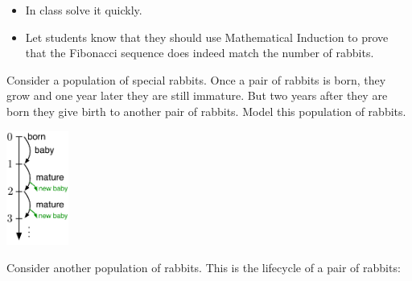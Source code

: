 \begin{annotation}
	\begin{goals}
		\begin{itemize}
			\item In class solve it quickly.
			\item Let students know that they should use Mathematical Induction to prove that the Fibonacci sequence does indeed match the number of rabbits.
		\end{itemize}
\end{goals}
\end{annotation}
\begin{minipage}{.7\textwidth}
\question \label{de:simplerabbits}
	Consider a population of special rabbits. Once a pair of rabbits is born, they grow and one year later they are still immature. But two years after they are born they give birth to another pair of rabbits.
	Model this population of rabbits.
\end{minipage}
\hfill
\begin{minipage}{58pt}
	\includegraphics*[width=58pt]{images/module24-simple-life.pdf}
\end{minipage}
	


\bookonlynewpage


\question
	Consider another population of rabbits. This is the lifecycle of a pair of rabbits:

